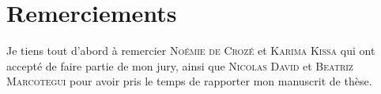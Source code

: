 

\begingroup

\let\clearpage\relax
\let\cleardoublepage\relax
\let\cleardoublepage\relax

\chapter*{Remerciements}

Je tiens tout d'abord à remercier \textsc{Noémie de Crozé} et \textsc{Karima Kissa} qui ont accepté de faire partie de mon jury, ainsi que \textsc{Nicolas David} et \textsc{Beatriz Marcotegui} pour avoir pris le temps de rapporter mon manuscrit de thèse.

\endgroup